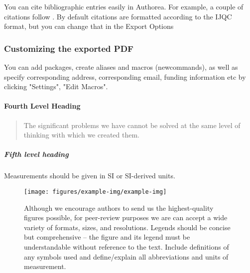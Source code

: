 \documentclass[num-refs]{wiley-article}
\begin{document}
You can cite bibliographic entries easily in Authorea. For example, a couple of citations follow \cite{Cavalleri_2016}. By default citations are formatted according to the IJQC format, but you can change that in the Export Options \cite{Meskine_2019}

\subsubsection{Customizing the exported PDF}
You can add packages, create aliases and macros (newcommands), as well as specify corresponding address, corresponding email, funding information etc by clicking "Settings", "Edit Macros".

\paragraph{Fourth Level Heading}

\begin{quote}
The significant problems we have cannot be solved at the same level of thinking with which we created them.
\end{quote}


\subparagraph{Fifth level heading}
Measurements should be given in SI or SI-derived units.
\begin{figure}[h!]
\begin{center}
\texttt{[image: figures/example-img/example-img]}
\caption{{Although we encourage authors to send us the highest-quality figures
possible, for peer-review purposes we are can accept a wide variety of
formats, sizes, and resolutions. Legends should be concise but
comprehensive -- the figure and its legend must be understandable
without reference to the text. Include definitions of any symbols used
and define/explain all abbreviations and units of measurement.
{\label{377733}}%
}}
\end{center}
\end{figure}
\end{document}
